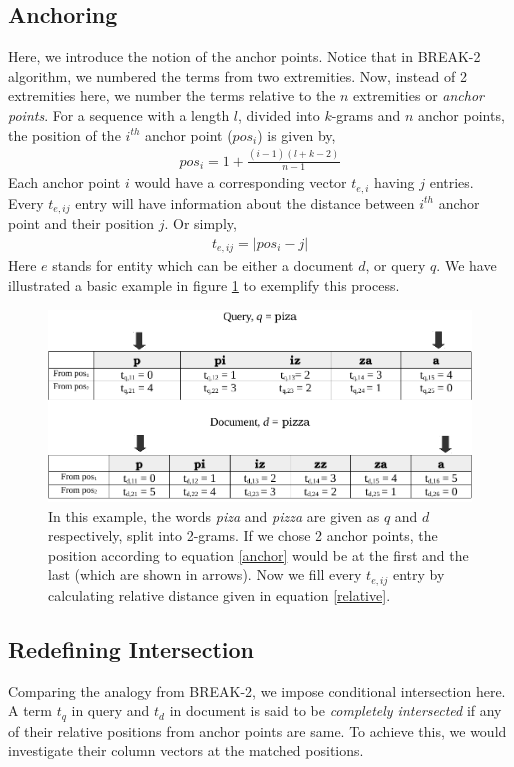 \subsection{Anchoring}
Here, we introduce the notion of the anchor points.
Notice that in BREAK-2 algorithm, we numbered the terms from two extremities.
Now, instead of 2 extremities here, we number the terms relative to the $n$ extremities or \textit{anchor points}.
For a sequence with a length $l$, divided into $k$-grams and $n$ anchor points, the position of the $i^{th}$ anchor point ($pos_i$) is given by,
\begin{align}
	\label{anchor}
	pos_i = 1 + \frac{(i - 1)(l + k - 2)}{n - 1}
\end{align}
Each anchor point $i$ would have a corresponding vector $t_{e,i}$ having $j$ entries.
Every $t_{e, ij}$ entry will have information about the distance between $i^{th}$ anchor point and their position $j$.
Or simply,
\begin{align}
	\label{relative}
	t_{e, ij} = |pos_i - j|
\end{align}
Here $e$ stands for entity which can be either a document $d$, or query $q$.
We have illustrated a basic example in figure \ref{breakn} to exemplify this process.
\begin{figure}[h]
	\centering
	\includegraphics[width=\textwidth]{gfx/break-n.pdf}
	\caption{In this example, the words \textit{piza} and \textit{pizza} are given as $q$ and $d$ respectively, split into 2-grams. If we chose 2 anchor points, the position according to equation \ref{anchor} would be at the first and the last (which are shown in arrows). Now we fill every $t_{e, ij}$ entry by calculating relative distance given in equation \ref{relative}.}
	\label{breakn}
\end{figure}

\subsection{Redefining Intersection}
Comparing the analogy from BREAK-2, we impose conditional intersection here.
A term $t_q$ in query and $t_d$ in document is said to be \textit{completely intersected} if any of their relative positions from anchor points are same.
To achieve this, we would investigate their column vectors at the matched positions.

